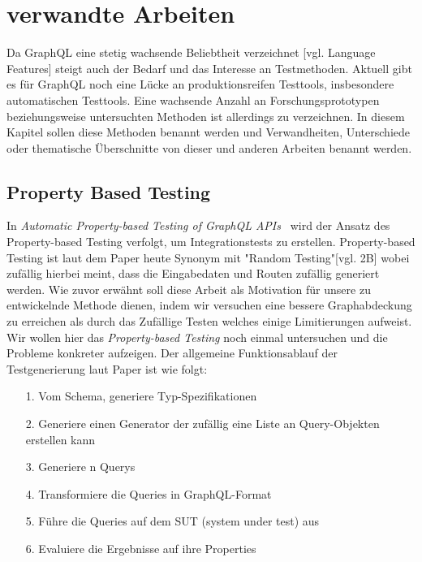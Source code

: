 \chapter{verwandte Arbeiten}
\label{relatedWork}

Da GraphQL eine stetig wachsende Beliebtheit verzeichnet \cite{graphql-growing-report}[vgl. Language Features] steigt auch der Bedarf und das Interesse an Testmethoden.
Aktuell gibt es für GraphQL noch eine Lücke an produktionsreifen Testtools, insbesondere automatischen Testtools.
Eine wachsende Anzahl an Forschungsprototypen beziehungsweise untersuchten Methoden ist allerdings zu verzeichnen.
In diesem Kapitel sollen diese Methoden benannt werden und Verwandheiten, Unterschiede oder thematische Überschnitte von dieser und anderen Arbeiten benannt werden.

\section{Property Based Testing}

In \textit{Automatic Property-based Testing of GraphQL APIs}~\cite{property-based-testing} wird der Ansatz des Property-based Testing verfolgt, um Integrationstests zu erstellen.
Property-based Testing ist laut dem Paper heute Synonym mit "Random Testing"\cite{property-based-testing}[vgl. 2B] wobei zufällig hierbei meint, dass die Eingabedaten und Routen zufällig generiert werden.
Wie zuvor erwähnt soll diese Arbeit als Motivation für unsere zu entwickelnde Methode dienen, indem wir versuchen eine bessere Graphabdeckung zu erreichen als durch
das Zufällige Testen welches einige Limitierungen aufweist.
Wir wollen hier das \textit{Property-based Testing} noch einmal untersuchen und die Probleme konkreter aufzeigen.
Der allgemeine Funktionsablauf der Testgenerierung laut Paper ist wie folgt:

\begin{center}
    \begin{itemize}
        \item[1.] Vom Schema, generiere Typ-Spezifikationen
        \item[2.] Generiere einen Generator der zufällig eine Liste an Query-Objekten erstellen kann
        \item[3.] Generiere n Querys
        \item[4.] Transformiere die Queries in GraphQL-Format
        \item[5.] Führe die Queries auf dem SUT (system under test) aus
        \item[6.] Evaluiere die Ergebnisse auf ihre Properties
    \end{itemize}{\cite[vgl. 3. Proposed Method]{property-based-testing}}
\end{center}

